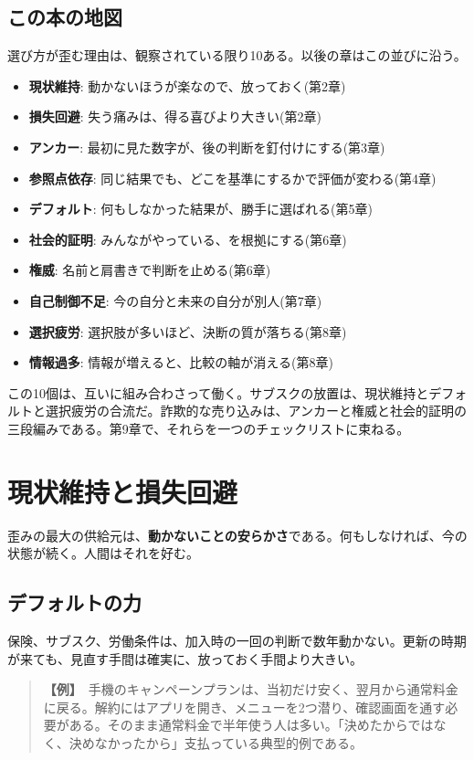 \documentclass{article}
\begin{document}
\subsection{この本の地図}

選び方が歪む理由は、観察されている限り10ある。以後の章はこの並びに沿う。

\begin{itemize}
\item \textbf{現状維持}: 動かないほうが楽なので、放っておく(第2章)
\item \textbf{損失回避}: 失う痛みは、得る喜びより大きい(第2章)
\item \textbf{アンカー}: 最初に見た数字が、後の判断を釘付けにする(第3章)
\item \textbf{参照点依存}: 同じ結果でも、どこを基準にするかで評価が変わる(第4章)
\item \textbf{デフォルト}: 何もしなかった結果が、勝手に選ばれる(第5章)
\item \textbf{社会的証明}: みんながやっている、を根拠にする(第6章)
\item \textbf{権威}: 名前と肩書きで判断を止める(第6章)
\item \textbf{自己制御不足}: 今の自分と未来の自分が別人(第7章)
\item \textbf{選択疲労}: 選択肢が多いほど、決断の質が落ちる(第8章)
\item \textbf{情報過多}: 情報が増えると、比較の軸が消える(第8章)
\end{itemize}

この10個は、互いに組み合わさって働く。サブスクの放置は、現状維持とデフォルトと選択疲労の合流だ。詐欺的な売り込みは、アンカーと権威と社会的証明の三段編みである。第9章で、それらを一つのチェックリストに束ねる。

\section{現状維持と損失回避}

歪みの最大の供給元は、\textbf{動かないことの安らかさ}である。何もしなければ、今の状態が続く。人間はそれを好む。

\subsection{デフォルトの力}

保険、サブスク、労働条件は、加入時の一回の判断で数年動かない。更新の時期が来ても、見直す手間は確実に、放っておく手間より大きい。

\begin{quote}
\textbf{【例】}\ 手機のキャンペーンプランは、当初だけ安く、翌月から通常料金に戻る。解約にはアプリを開き、メニューを2つ潜り、確認画面を通す必要がある。そのまま通常料金で半年使う人は多い。「決めたからではなく、決めなかったから」支払っている典型的例である。
\end{quote}
\end{document}
